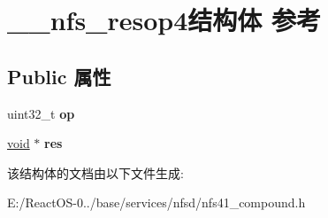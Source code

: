 \hypertarget{struct____nfs__resop4}{}\section{\+\_\+\+\_\+nfs\+\_\+resop4结构体 参考}
\label{struct____nfs__resop4}
\subsection*{Public 属性}
\begin{DoxyCompactItemize}
\item 
\mbox{\label{struct____nfs__resop4_a6a7eef648f7544e4fc0e44a889fe54f9}} 
uint32\+\_\+t {\bfseries op}
\item 
\mbox{\label{struct____nfs__resop4_aff24f72bce4dd35bd0048ef8261d16b4}} 
\hyperlink{interfacevoid}{void} $\ast$ {\bfseries res}
\end{DoxyCompactItemize}


该结构体的文档由以下文件生成\+:\begin{DoxyCompactItemize}
\item 
E\+:/\+React\+O\+S-\/0../base/services/nfsd/nfs41\+\_\+compound.\+h\end{DoxyCompactItemize}
